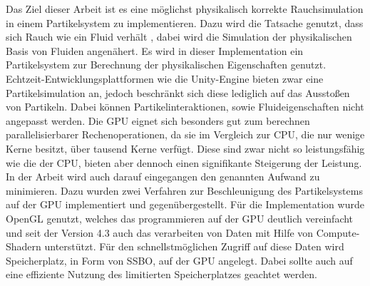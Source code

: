 \documentclass[intern,palatino]{cgBA}
\begin{document}
Das Ziel dieser Arbeit ist es eine möglichst physikalisch korrekte Rauchsimulation in einem Partikelsystem zu implementieren. Dazu wird die Tatsache genutzt, dass sich Rauch wie ein Fluid verhält \cite{stam2003real}, dabei wird die Simulation der physikalischen Basis von Fluiden angenähert. Es wird in dieser Implementation ein Partikelsystem zur Berechnung der physikalischen Eigenschaften genutzt. Echtzeit-Entwicklungsplattformen wie die Unity-Engine bieten zwar eine Partikelsimulation an, jedoch beschränkt sich diese lediglich auf das Ausstoßen von Partikeln. Dabei können Partikelinteraktionen, sowie Fluideigenschaften nicht angepasst werden.
\newline
Die GPU eignet sich besonders gut zum berechnen parallelisierbarer Rechenoperationen, da sie im Vergleich zur CPU, die nur wenige Kerne besitzt, über tausend Kerne verfügt. Diese sind zwar nicht so leistungsfähig wie die der CPU, bieten aber dennoch einen signifikante Steigerung der Leistung.
\newline
In der Arbeit wird auch darauf eingegangen den genannten Aufwand zu minimieren. Dazu wurden zwei Verfahren zur Beschleunigung des Partikelsystems auf der GPU implementiert und gegenübergestellt.
\newline
Für die Implementation wurde OpenGL genutzt, welches das programmieren auf der GPU deutlich vereinfacht und seit der Version 4.3 auch das verarbeiten von Daten mit Hilfe von Compute-Shadern unterstützt. Für den schnellstmöglichen Zugriff auf diese Daten wird Speicherplatz, in Form von SSBO, auf der GPU angelegt. Dabei sollte auch auf eine effiziente Nutzung des limitierten Speicherplatzes geachtet werden.

\end{document}
